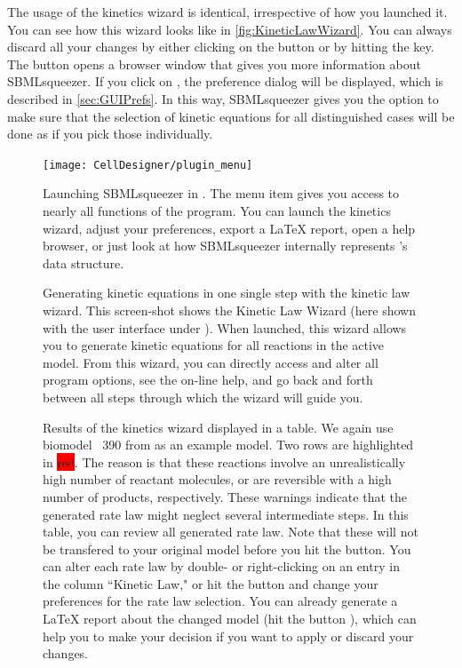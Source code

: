 The usage of the kinetics wizard is identical, irrespective of how you launched it.
You can see how this wizard looks like in \vref{fig:KineticLawWizard}.
You can always discard all your changes by either clicking on the  button or by hitting the \keys{\escwin} key.
The  button opens a browser window that gives you more information about SBMLsqueezer.
If you click on , the preference dialog will be displayed, which is described in \vref{sec:GUIPrefs}.
In this way, SBMLsqueezer gives you the option to make sure that the selection of kinetic equations for all distinguished cases will be done as if you pick those individually.
\begin{figure}
\texttt{[image: CellDesigner/plugin\_menu]}
\caption[Launching SBMLsqueezer in \CellDesigner]{Launching SBMLsqueezer in \CellDesigner.
The menu item  gives you access to nearly all functions of the program.
You can launch the kinetics wizard, adjust your preferences, export a \LaTeX{} report, open a help browser, or just look at how SBMLsqueezer internally represents \CellDesigner's data structure.}
\label{fig:PluginMenu}
\end{figure}
\begin{figure}[b!]
\caption[Generating kinetic equations in one single step with the kinetic law wizard]{Generating kinetic equations in one single step with the kinetic law wizard.
This screen-shot shows the Kinetic Law Wizard (here shown with the user interface
under \MacOSX). When launched, this wizard allows you to generate kinetic equations for all reactions in the active model. From this wizard, you can directly access and alter all program options, see the on-line help, and go back and forth between all steps through which the wizard will guide you.}
\label{fig:KineticLawWizard}
\end{figure}
\begin{figure}[t!]
\caption[Results of the kinetics wizard displayed in a table]{Results of the kinetics wizard displayed in a table.
We again use biomodel \numero~390 from \BioModels \citep{Li2010a, Arnold2011} as an example model.
Two rows are highlighted in \colorbox{red}{red}.
The reason is that 
these reactions involve an unrealistically high number of reactant molecules, or are reversible with a high number of products, respectively.
These warnings indicate that the generated rate law might neglect several intermediate steps.
In this table, you can review all generated rate law.
Note that these will not be transfered to your original model before you hit the  button.
You can alter each rate law by double- or right-clicking on an entry in the column ``Kinetic Law," or hit the  button and change your preferences for the rate law selection.
You can already generate a \LaTeX{} report about the changed model (hit the button ), which can help you to make your decision if you want to apply or discard your changes.}
\label{fig:wizard_results_table}
\end{figure}
